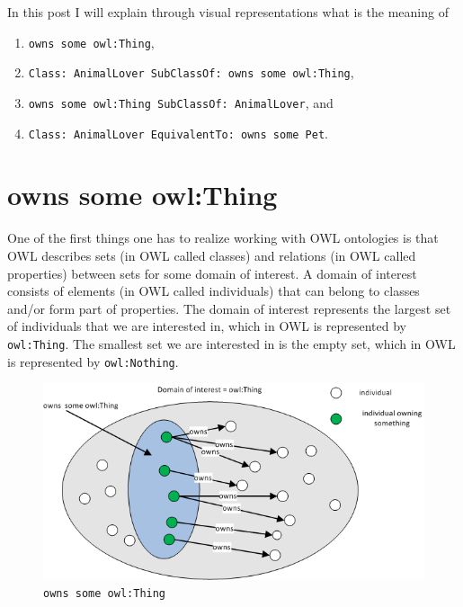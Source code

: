 \documentclass{amsart}
\begin{document}
  In this post I will explain through visual representations what is the meaning of
  \begin{enumerate}
   \item \texttt{owns some owl:Thing},
   \item \texttt{Class: AnimalLover SubClassOf: owns some owl:Thing},
   \item \texttt{owns some owl:Thing SubClassOf: AnimalLover}, and
   \item \texttt{Class: AnimalLover EquivalentTo: owns some Pet}.
   \end{enumerate}

  
  \section{owns some owl:Thing}
  One of the first things one has to realize working with OWL ontologies is that OWL describes sets (in OWL called classes) and relations (in OWL called properties) between sets for some domain of interest. A domain of interest consists of elements (in OWL called individuals) that can belong to classes and/or form part of properties. The domain of interest represents the largest set of individuals that we are interested in, which in OWL is represented by \texttt{owl:Thing}. The smallest set we are interested in is the empty set, which in OWL is represented by \texttt{owl:Nothing}.
  
    \begin{figure}
      \centering \includegraphics[trim = 0mm 0mm 0mm 0mm, clip, scale=1]{./ownsSomeThing.png}
      \caption{\texttt{owns some owl:Thing}}\label{fig_ownsSomeThing}
    \end{figure}  
    
\end{document}
